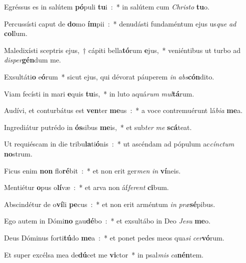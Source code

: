 \item Egréssus es in salútem \textbf{pó}puli \textbf{tu}i~:~* in salútem cum \emph{Chri}\emph{sto} \textbf{tu}o.\ifx\lalinebreakafternineteen\undefined\else\\\fi
\item Percussísti caput de \textbf{do}mo \textbf{ím}pii~:~* denudásti fundaméntum ejus us\emph{que} \emph{ad} \textbf{col}lum.
\item Maledixísti sceptris ejus,~† cápiti bella\textbf{tó}rum \textbf{e}jus,~* veniéntibus ut turbo ad \emph{di}\emph{sper}\textbf{gén}dum me.
\item Exsultáti\textbf{o} e\textbf{ó}rum~* sicut ejus, qui dévorat páuperem \emph{in} \emph{abs}\textbf{cón}dito.
\item Viam fecísti in mari \textbf{e}quis \textbf{tu}is,~* in luto aquá\emph{rum} \emph{mul}\textbf{tá}rum.
\item Audívi, et conturbátus est \textbf{ven}ter \textbf{me}us~:~* a voce contremuérunt lá\emph{bi}\emph{a} \textbf{me}a.
\item Ingrediátur putrédo in \textbf{ós}sibus \textbf{me}is,~* et sub\emph{ter} \emph{me} \textbf{scá}teat.
\item Ut requiéscam in die tribu\textbf{la}ti\textbf{ó}nis~:~* ut ascéndam ad pópulum ac\emph{cín}\emph{ctum} \textbf{no}strum.
\item Ficus enim \textbf{non} flo\textbf{ré}bit~:~* et non erit ger\emph{men} \emph{in} \textbf{ví}neis.
\item Mentiétur \textbf{o}pus o\textbf{lí}væ~:~* et arva non áf\emph{fe}\emph{rent} \textbf{ci}bum.
\item Abscindétur de o\textbf{ví}li \textbf{pe}cus~:~* et non erit arméntum \emph{in} \emph{præ}\textbf{sé}pibus.
\item Ego autem in Dómi\textbf{no} gau\textbf{dé}bo~:~* et exsultábo in Deo \emph{Je}\emph{su} \textbf{me}o.
\item Deus Dóminus forti\textbf{tú}do \textbf{me}a~:~* et ponet pedes meos qua\emph{si} \emph{cer}\textbf{vó}rum.
\item Et super excélsa mea de\textbf{dú}cet me \textbf{vi}ctor~* in psal\emph{mis} \emph{ca}\textbf{nén}tem.